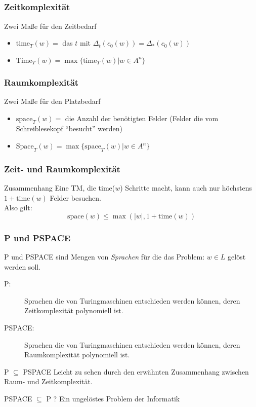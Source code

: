 \subsection*{}
\begin{frame}
	\frametitle{Zeitkomplexität}
	\begin{block}{Zwei Maße für den Zeitbedarf}
		\begin{itemize}
			\item $\text{time}_T(w)=$ das $t$ mit $\Delta_t(c_0(w))=\Delta_*(c_0(w))$
			\item $\text{Time}_T(w)=\max\{\text{time}_T(w)|w\in A^n\}$
		\end{itemize}
	\end{block}
\end{frame}
\begin{frame}
	\frametitle{Raumkomplexität}
	\begin{block}{Zwei Maße für den Platzbedarf}
		\begin{itemize}
			\item $\text{space}_T(w)=$ die Anzahl der benötigten Felder (Felder die vom Schreiblesekopf "`besucht"' werden)
			\item $\text{Space}_T(w)=\max\{\text{space}_T(w)|w\in A^n\}$
		\end{itemize}
	\end{block}
\end{frame}
\begin{frame}
	\frametitle{Zeit- und Raumkomplexität}
	\begin{block}{Zusammenhang}
		Eine TM, die time($w$) Schritte macht, kann auch nur höchstens $1+\text{time}(w)$ Felder besuchen.\\
		Also gilt:
		$$\text{space}(w)\leq \max(|w|, 1+\text{time}(w))$$
	\end{block}
\end{frame}
\begin{frame}
  \frametitle{P und PSPACE}
  P und PSPACE sind Mengen von \emph{Sprachen} für die das Problem: $w \in L$ gelöst werden soll.
	\begin{description}
		\item[P:] Sprachen die von Turingmaschinen entschieden werden können, deren Zeitkomplexität polynomiell ist.
		\item[PSPACE:] Sprachen die von Turingmaschinen entschieden werden können, deren Raumkomplexität polynomiell ist.
	\end{description}
	\begin{block}{P $\subseteq$ PSPACE}
		Leicht zu sehen durch den erwähnten Zusammenhang zwischen Raum- und Zeitkomplexität.
	\end{block}
	\pause
	\begin{alertblock}{PSPACE $\subseteq$ P ?}
		Ein ungelöstes Problem der Informatik
	\end{alertblock}
\end{frame}


